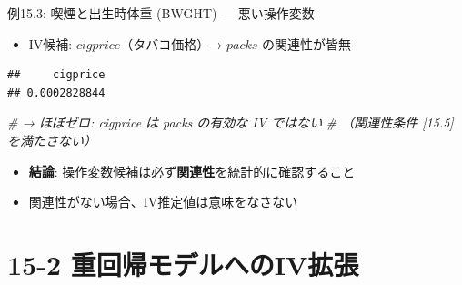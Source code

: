 \documentclass[
  ignorenonframetext,
]{beamer}
\newenvironment{Shaded}{\begin{snugshade}}{\end{snugshade}}
\newcommand{\AttributeTok}[1]{\textcolor[rgb]{0.13,0.29,0.53}{#1}}
\newcommand{\CommentTok}[1]{\textcolor[rgb]{0.56,0.35,0.01}{\textit{#1}}}
\newcommand{\FunctionTok}[1]{\textcolor[rgb]{0.13,0.29,0.53}{\textbf{#1}}}
\newcommand{\NormalTok}[1]{#1}
\newcommand{\SpecialCharTok}[1]{\textcolor[rgb]{0.81,0.36,0.00}{\textbf{#1}}}
\newcommand{\StringTok}[1]{\textcolor[rgb]{0.31,0.60,0.02}{#1}}
\providecommand{\tightlist}{%
  \setlength{\itemsep}{0pt}\setlength{\parskip}{0pt}}
\begin{document}
\begin{frame}[fragile]{例15.3: 喫煙と出生時体重 (BWGHT) ---
悪い操作変数}
\label{ux4f8b15.3-ux55abux7159ux3068ux51faux751fux6642ux4f53ux91cd-bwght-ux60aaux3044ux64cdux4f5cux5909ux6570}
\begin{itemize}
\tightlist
\item
  IV候補: \(cigprice\)（タバコ価格）→ \(packs\) の関連性が皆無
\end{itemize}

\footnotesize

\begin{Shaded}
\end{Shaded}

\begin{verbatim}
##     cigprice 
## 0.0002828844
\end{verbatim}

\begin{Shaded}
\begin{Highlighting}[]
\CommentTok{\# → ほぼゼロ: cigprice は packs の有効な IV ではない}
\CommentTok{\# （関連性条件 [15.5] を満たさない）}
\end{Highlighting}
\end{Shaded}

\normalsize

\begin{itemize}
\tightlist
\item
  \textbf{結論}: 操作変数候補は必ず\textbf{関連性}を統計的に確認すること
\item
  関連性がない場合、IV推定値は意味をなさない
\end{itemize}
\end{frame}

\section{15-2
重回帰モデルへのIV拡張}\label{ux91cdux56deux5e30ux30e2ux30c7ux30ebux3078ux306eivux62e1ux5f35}
\end{document}
